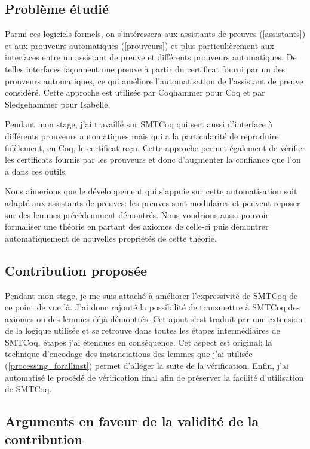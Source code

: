 \documentclass[11pt]{article}
\begin{document}
\subsection{Problème étudié}

Parmi ces logiciels formels, on s'intéressera aux assistants de preuves (\ref{assistants}) et aux prouveurs automatiques (\ref{prouveurs}) et plus particulièrement aux interfaces entre un assistant de preuve et différents prouveurs automatiques. De telles interfaces façonnent une preuve à partir du certificat fourni par un des prouveurs automatiques, ce qui améliore l'automatisation de l'assistant de preuve considéré. Cette approche est utilisée par Coqhammer \cite{coqhammer} pour Coq et par Sledgehammer \cite{sledgehammer_manual} pour Isabelle. \medbreak

Pendant mon stage, j'ai travaillé sur SMTCoq \cite{smtcoq_code, these_keller} qui sert aussi d'interface à différents prouveurs automatiques mais qui a la particularité de reproduire fidèlement, en Coq, le certificat reçu. Cette approche permet également de vérifier les certificats fournis par les prouveurs et donc d'augmenter la confiance que l'on a dans ces outils.\medbreak

Nous aimerions que le développement qui s'appuie sur cette automatisation soit adapté aux assistants de preuves: les preuves sont modulaires et peuvent reposer sur des lemmes précédemment démontrés. Nous voudrions aussi pouvoir formaliser une théorie en partant des axiomes de celle-ci puis démontrer automatiquement de nouvelles propriétés de cette théorie.

\subsection{Contribution proposée}

Pendant mon stage, je me suis attaché à améliorer l'expressivité de SMTCoq de ce point de vue là. J'ai donc rajouté la possibilité de transmettre à SMTCoq des axiomes ou des lemmes déjà démontrés. Cet ajout s'est traduit par une extension de la logique utilisée et se retrouve dans toutes les étapes intermédiaires de SMTCoq, étapes j'ai étendues en conséquence.  Cet aspect est original: la technique d'encodage des instanciations des lemmes que j'ai utilisée (\ref{processing_forallinst}) permet d'alléger la suite de la vérification. Enfin, j'ai automatisé le procédé de vérification final afin de préserver la facilité d'utilisation de SMTCoq.


\subsection{Arguments en faveur de la validité de la contribution}
\end{document}
